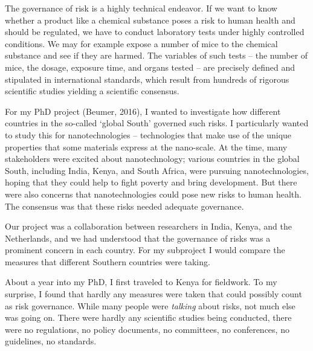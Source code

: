 \documentclass[authordate, anecdote]{jote-new-article}
\author[1]{\mbox{Koen Beumer\orcid{0000-0003-4533-3581}}}
\affil[1]{Copernicus Institute of Sustainable Development, Utrecht University, Utrecht, the Netherlands}
\begin{document}
\begin{frontmatter}
  \maketitle
  \begin{abstract}
    \printabstracttext
  \end{abstract}
\end{frontmatter}




	The governance of risk is a highly technical endeavor. If we want to know whether a product like a chemical substance poses a risk to human health and should be regulated, we have to conduct laboratory tests under highly controlled conditions. We may for example expose a number of mice to the chemical substance and see if they are harmed. The variables of such tests -- the number of mice, the dosage, exposure time, and organs tested -- are precisely defined and stipulated in international standards, which result from hundreds of rigorous scientific studies yielding a scientific consensus.



	For my PhD project (Beumer, 2016), I wanted to investigate how different countries in the so-called ‘global South' governed such risks. I particularly wanted to study this for nanotechnologies -- technologies that make use of the unique properties that some materials express at the nano-scale. At the time, many stakeholders were excited about nanotechnology; various countries in the global South, including India, Kenya, and South Africa, were pursuing nanotechnologies, hoping that they could help to fight poverty and bring development. But there were also concerns that nanotechnologies could pose new risks to human health. The consensus was that these risks needed adequate governance.



	Our project was a collaboration between researchers in India, Kenya, and the Netherlands, and we had understood that the governance of risks was a prominent concern in each country. For my subproject I would compare the measures that different Southern countries were taking.



	About a year into my PhD, I first traveled to Kenya for fieldwork. To my surprise, I found that hardly any measures were taken that could possibly count as risk governance. While many people were \emph{talking }about risks, not much else was going on. There were hardly any scientific studies being conducted, there were no regulations, no policy documents, no committees, no conferences, no guidelines, no standards.
\end{document}

